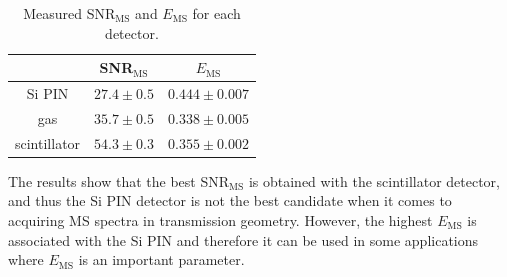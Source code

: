 
\begin{table}[H]
\centering
\begin{tabular}{|c|c|c|}
\hline
   & SNR$_{\textrm{MS}}$ & $E_{\textrm{MS}}$ \\ \hline
Si PIN & $27.4 \pm 0.5$    & $0.444 \pm 0.007$  \\ \hline
gas & $35.7 \pm 0.5$    & $0.338 \pm 0.005$ \\ \hline
scintillator  & $54.3 \pm 0.3$    & $0.355 \pm 0.002$ \\ \hline
\end{tabular}
\caption{Measured SNR$_{\textrm{MS}}$ and $E_{\textrm{MS}}$ for each detector.}
 \label{mossres}
\end{table}

The results show that the best SNR$_{\textrm{MS}}$ is obtained with the scintillator detector, and thus the Si PIN detector is not the best candidate when it comes to acquiring MS spectra in transmission geometry. However, the highest $E_{\textrm{MS}}$ is associated with the Si PIN and therefore it can be used in some applications where $E_{\textrm{MS}}$ is an important parameter. 

